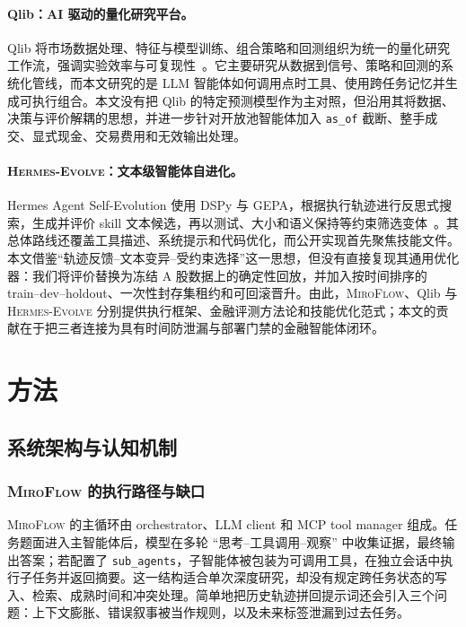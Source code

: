 \documentclass[11pt]{article}
\newcommand{\miroflow}{\textsc{MiroFlow}}
\newcommand{\hermes}{\textsc{Hermes-Evolve}}
\begin{document}
\paragraph{Qlib：AI 驱动的量化研究平台。}
Qlib 将市场数据处理、特征与模型训练、组合策略和回测组织为统一的量化研究工作流，强调实验效率与可复现性~\citep{qlib2020}。它主要研究从数据到信号、策略和回测的系统化管线，而本文研究的是 LLM 智能体如何调用点时工具、使用跨任务记忆并生成可执行组合。本文没有把 Qlib 的特定预测模型作为主对照，但沿用其将数据、决策与评价解耦的思想，并进一步针对开放池智能体加入 \texttt{as\_of} 截断、整手成交、显式现金、交易费用和无效输出处理。

\paragraph{\hermes{}：文本级智能体自进化。}
Hermes Agent Self-Evolution 使用 DSPy 与 GEPA，根据执行轨迹进行反思式搜索，生成并评价 skill 文本候选，再以测试、大小和语义保持等约束筛选变体~\citep{hermes2025}。其总体路线还覆盖工具描述、系统提示和代码优化，而公开实现首先聚焦技能文件。本文借鉴``轨迹反馈--文本变异--受约束选择''这一思想，但没有直接复现其通用优化器：我们将评价替换为冻结 A 股数据上的确定性回放，并加入按时间排序的 train--dev--holdout、一次性封存集租约和可回滚晋升。由此，\miroflow{}、Qlib 与 \hermes{} 分别提供执行框架、金融评测方法论和技能优化范式；本文的贡献在于把三者连接为具有时间防泄漏与部署门禁的金融智能体闭环。

\section{方法}
\label{sec:methods}

\subsection{系统架构与认知机制}
\label{sec:system}

\subsubsection{\miroflow{} 的执行路径与缺口}

\miroflow{} 的主循环由 orchestrator、LLM client 和 MCP tool manager 组成。任务题面进入主智能体后，模型在多轮 ``思考--工具调用--观察'' 中收集证据，最终输出答案；若配置了 \texttt{sub\_agents}，子智能体被包装为可调用工具，在独立会话中执行子任务并返回摘要。这一结构适合单次深度研究，却没有规定跨任务状态的写入、检索、成熟时间和冲突处理。简单地把历史轨迹拼回提示词还会引入三个问题：上下文膨胀、错误叙事被当作规则，以及未来标签泄漏到过去任务。
\end{document}
